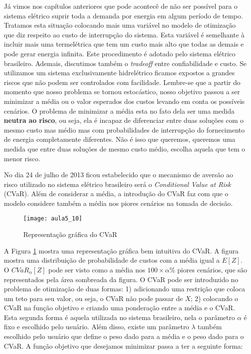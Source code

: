 Já vimos nos capítulos anteriores que pode acontecê de não ser possível para o sistema elétrico suprir toda a demanda por energia em algum período de tempo. Tratamos esta situação colocando mais uma variável no modelo de otimização que diz respeito ao custo de interrupção do sistema. Esta variável é semelhante à incluir mais uma termelétrica que tem um custo mais alto que todas as demais e pode gerar energia infinita. Este procedimento é adotado pelo sistema elétrico brasileiro. Ademais, discutimos também o \textit{tradeoff} entre confiabilidade e custo. Se utilizamos um sistema exclusivamente hidrelétrico ficamos expostos a grandes riscos que não podem ser controlados com facilidade. Lembre-se que a partir do momento que nosso problema se tornou estocástico, nosso objetivo passou a ser minimizar a média ou o valor esperados dos custos levando em conta os possíveis cenários. O problema  de minimizar a média esta no fato dela ser uma medida \textbf{neutra ao risco}, ou seja, ela é incapaz de diferenciar entre duas soluções com o mesmo custo mas médio mas com probabilidades de interrupção do fornecimento de energia completamente diferentes. Não é isso que queremos, queremos uma medida que entre duas soluções de mesmo custo médio, escolha aquela que tem o menor risco. 

No dia 24 de julho de 2013 ficou estabelecido que o mecanismo de aversão ao risco utilizado no sistema elétrico brasileiro será o \textit{Conditional Value at Risk} (CVaR). Além de considerar a média, a introdução do CVaR faz com que o modelo considere também a média nos piores cenários na tomada de decisão. 


\begin{figure}[H]
\begin{centering}
\texttt{[image: aula5\_10]}\protect\caption{\label{fig:cvar1} Representação gráfica do CVaR} 
\end{centering}
\end{figure}

A Figura \ref{fig:cvar1} mostra uma representação gráfica bem intuitiva do CVaR. A figura mostra uma distribuição de probabilidade de custos com a média igual a $E[Z]$. O $CVaR_\alpha[Z]$ pode ser visto como a média nos $100\times \alpha \%$ piores cenários, que são representados pela área sombreada da figura. O CVaR pode ser introduzido no problema de otimização de duas formas: 1) adicionando uma restrição que coloca um teto para seu valor, ou seja, o CVaR não pode passar de $X$; 2) colocando o CVaR na função objetivo e criando uma ponderação entre a média e o CVaR. Esta segunda forma é aquela utilizada no sistema brasileiro, nela o parâmetro $\alpha$ é fixo e escolhido pelo usuário. Além disso, existe um parâmetro $\lambda$ também escolhido pelo usuário que define o peso dado para a média e o peso dado para o CVaR. A função objetivo que desejamos minimizar passa a ter a seguinte forma:

